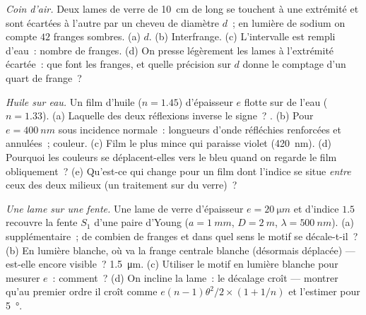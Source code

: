 \begin{exercise}[$\star\star$]\label{exo:b2:two-wave-interference:8}
\emph{Coin d'air.} Deux lames de verre de \qty{10}{cm} de long se touchent à une extrémité et
sont écartées à l'autre par un cheveu de diamètre $d$~; en lumière de sodium
on compte $42$ franges sombres. (a) $d$. (b) Interfrange. (c) L'intervalle
est rempli d'eau~: nombre de franges. (d) On presse légèrement les lames à l'extrémité écartée~: que font
les franges, et quelle précision sur
$d$ donne le comptage d'un quart de frange~?
\end{exercise}

\begin{exercise}[$\star\star$]\label{exo:b2:two-wave-interference:9}
\emph{Huile sur eau.} Un film d'huile ($n = 1.45$) d'épaisseur $e$ flotte
sur de l'eau ($n = 1.33$). (a) Laquelle des deux réflexions inverse le
signe~? . (b) Pour $e = \qty{400}{nm}$ sous incidence normale~:
longueurs d'onde réfléchies renforcées et annulées~; couleur. (c) Film le plus mince
qui paraisse violet (\qty{420}{nm}). (d) Pourquoi les couleurs se déplacent-elles vers
le bleu quand on regarde le film obliquement~? (e) Qu'est-ce qui change pour un film
dont l'indice se situe \emph{entre} ceux des deux milieux (un traitement sur du
verre)~?
\end{exercise}

\begin{exercise}[$\star\star\star$]\label{exo:b2:two-wave-interference:10}
\emph{Une lame sur une fente.} Une lame de verre d'épaisseur $e = \qty{20}{\micro m}$
et d'indice $1.5$ recouvre la fente $S_1$ d'une paire d'Young ($a = \qty{1}{mm}$, $D =
\qty{2}{m}$, $\lambda = \qty{500}{nm}$). (a)  supplémentaire~; de combien de franges
et dans quel sens le motif se décale-t-il~? (b) En lumière blanche,
où va la frange centrale blanche (désormais déplacée) --- est-elle encore
visible~?  \qty{1.5}{\micro m}. (c) Utiliser le motif en lumière
blanche pour mesurer $e$~: comment~? (d) On incline la lame~: le décalage croît
--- montrer qu'au premier ordre il croît comme $e(n - 1)\theta^2/2 \times (1 + 1/n)$
et l'estimer pour \qty{5}{\degree}.
\end{exercise}

